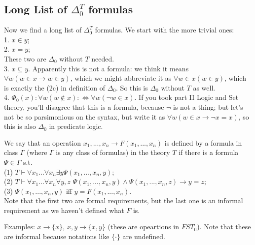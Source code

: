 \documentclass[a4paper]{article}
\begin{document}
\subsection{Long List of $\Delta_0^T$ formulas}

Now we find a long list of $\Delta_0^T$ formulas. We start with the more trivial ones:\\
1. $x\in y$;\\
2. $x=y$;\\
These two are $\Delta_0$ without $T$ needed.\\
3. $x \subseteq y$. Apparently this is not a formula: we think it means $\forall w (w \in x \to w \in y)$, which we might abbreviate it as $\forall w \in x (w \in y)$, which is exactly the (2c) in definition of $\Delta_0$. So this is $\Delta_0$ without $T$ as well.\\
4. $\Phi_0(x): \forall w (w \not\in x) :\iff \forall w(\neg w \in x)$. If you took part II Logic and Set theory, you'll disagree that this is a formula, because $\neg$ is not a thing; but let's not be so parsimonious on the syntax, but write it as $\forall w (w \in x \to \neg x =x)$, so this is also $\Delta_0$ in predicate logic.

We say that an operation $x_1,...,x_n \to F(x_1,...,x_n)$ is defined by a formula in class $\Gamma$ (where $\Gamma$ is any class of formulas) in the theory $T$ if there is a formula $\Psi \in \Gamma$ s.t. \\
(1) $T \vdash \forall x_1...\forall x_n \exists y \Psi(x_1,...,x_n,y)$;\\
(2) $T \vdash \forall x_1...\forall x_n \forall y,z$ $\Psi(x_1,...,x_n,y) \wedge \Psi(x_1,...,x_n,z) \to y=z$;\\
(3) $\Psi(x_1,...,x_n,y)$ iff $y=F(x_1,...,x_n)$.\\
Note that the first two are formal requirements, but the last one is an informal requirement as we haven't defined what $F$ is.

Examples: $x \to \{x\}$, $x,y \to \{x,y\}$ (these are opeartions in $FST_0$). Note that these are informal because notations like $\{\cdot\}$ are undefined.
\end{document}
